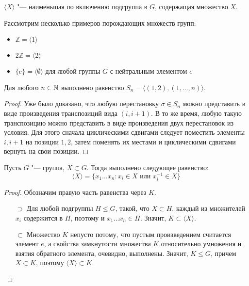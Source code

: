 \begin{note}
	$\langle X\rangle$ "--- наименьшая по включению подгруппа в $G$, содержащая множество $X$.
\end{note}

\begin{example}
	Рассмотрим несколько примеров порождающих множеств групп:
	\begin{itemize}
		\item $\mathbb{Z} = \langle 1 \rangle$
		\item $2\mathbb{Z} = \langle 2 \rangle$
		\item $\{e\} = \langle \emptyset \rangle$ для любой группы $G$ с нейтральным элементом $e$
	\end{itemize}
\end{example}

\begin{proposition}
	Для любого $n \in \mathbb{N}$ выполнено равенство $S_n = \langle (1, 2), (1, \dots, n)\rangle$.
\end{proposition}

\begin{proof}
	Уже было доказано, что любую перестановку $\sigma \in S_n$ можно представить в виде произведения транспозиций вида $(i, i+1)$. В то же время, любую такую транспозицию можно представить в виде произведения двух перестановок из условия. Для этого сначала циклическими сдвигами следует поместить элементы $i, i+1$ на позиции $1, 2$, затем поменять их местами и циклическими сдвигами вернуть на свои позиции.
\end{proof}

\begin{proposition}
	Пусть $G$ "--- группа, $X \subset G$. Тогда выполнено следующее равенство:
	\[\langle X\rangle = \{x_1\dots x_n: x_i \in X \text{ или } x_i^{-1} \in X\}\]
\end{proposition}

\begin{proof}
	Обозначим правую часть равенства через $K$.
	\begin{itemize}
		\item[$\supset$] Для любой подгруппы $H \le G$, такой, что $X \subset H$, каждый из множителей $x_i$ содержится в $H$, поэтому и $x_1\dots x_n \in H$. Значит, $K \subset \langle X\rangle$.
		\item[$\subset$] Множество $K$ непусто потому, что пустым произведением считается элемент $e$, а свойства замкнутости множества $K$ относительно умножения и взятия обратного элемента, очевидно, выполнены. Значит, $K \le G$, причем $X \subset K$, поэтому $\langle X\rangle \subset K$.\qedhere
	\end{itemize}
\end{proof}

